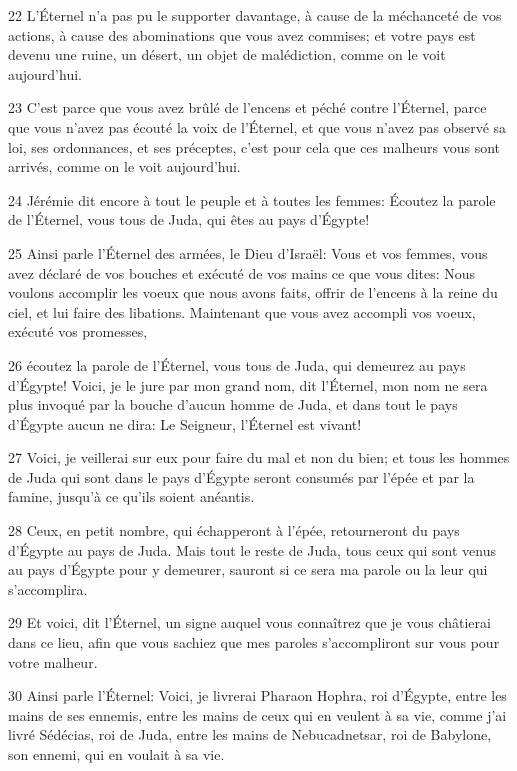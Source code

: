 \par 22 L'Éternel n'a pas pu le supporter davantage, à cause de la méchanceté de vos actions, à cause des abominations que vous avez commises; et votre pays est devenu une ruine, un désert, un objet de malédiction, comme on le voit aujourd'hui.
\par 23 C'est parce que vous avez brûlé de l'encens et péché contre l'Éternel, parce que vous n'avez pas écouté la voix de l'Éternel, et que vous n'avez pas observé sa loi, ses ordonnances, et ses préceptes, c'est pour cela que ces malheurs vous sont arrivés, comme on le voit aujourd'hui.
\par 24 Jérémie dit encore à tout le peuple et à toutes les femmes: Écoutez la parole de l'Éternel, vous tous de Juda, qui êtes au pays d'Égypte!
\par 25 Ainsi parle l'Éternel des armées, le Dieu d'Israël: Vous et vos femmes, vous avez déclaré de vos bouches et exécuté de vos mains ce que vous dites: Nous voulons accomplir les voeux que nous avons faits, offrir de l'encens à la reine du ciel, et lui faire des libations. Maintenant que vous avez accompli vos voeux, exécuté vos promesses,
\par 26 écoutez la parole de l'Éternel, vous tous de Juda, qui demeurez au pays d'Égypte! Voici, je le jure par mon grand nom, dit l'Éternel, mon nom ne sera plus invoqué par la bouche d'aucun homme de Juda, et dans tout le pays d'Égypte aucun ne dira: Le Seigneur, l'Éternel est vivant!
\par 27 Voici, je veillerai sur eux pour faire du mal et non du bien; et tous les hommes de Juda qui sont dans le pays d'Égypte seront consumés par l'épée et par la famine, jusqu'à ce qu'ils soient anéantis.
\par 28 Ceux, en petit nombre, qui échapperont à l'épée, retourneront du pays d'Égypte au pays de Juda. Mais tout le reste de Juda, tous ceux qui sont venus au pays d'Égypte pour y demeurer, sauront si ce sera ma parole ou la leur qui s'accomplira.
\par 29 Et voici, dit l'Éternel, un signe auquel vous connaîtrez que je vous châtierai dans ce lieu, afin que vous sachiez que mes paroles s'accompliront sur vous pour votre malheur.
\par 30 Ainsi parle l'Éternel: Voici, je livrerai Pharaon Hophra, roi d'Égypte, entre les mains de ses ennemis, entre les mains de ceux qui en veulent à sa vie, comme j'ai livré Sédécias, roi de Juda, entre les mains de Nebucadnetsar, roi de Babylone, son ennemi, qui en voulait à sa vie.

